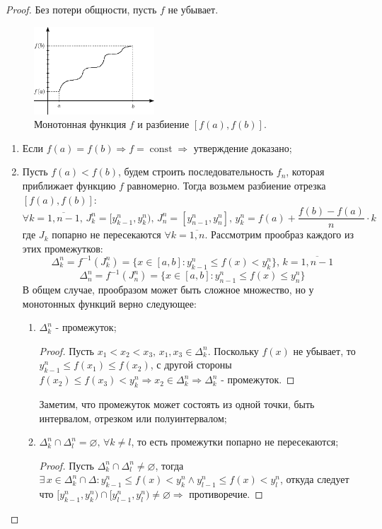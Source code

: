 \documentclass[12pt]{article}
\newcommand{\VN}{\varnothing}
\theoremstyle{definition}
\DeclareMathOperator{\const}{\text{const}}
\begin{document}
\begin{proof}
	Без потери общности, пусть $f$ не убывает.
	\begin{figure}[H]
		\centering
		\includegraphics[width=0.4\textwidth]{22_2.eps}
		\caption{Монотонная функция $f$ и разбиение $[f(a),f(b)]$.}
		\label{22_2}
	\end{figure}
	\begin{enumerate}[label={\arabic*)}]
		\item Если $f(a) = f(b) \Rightarrow f = \const \Rightarrow$ утверждение доказано;
		\item Пусть $f(a) < f(b)$, будем строить последовательность $f_n$, которая приближает функцию $f$ равномерно. Тогда возьмем разбиение отрезка $[f(a),f(b)]$: 
		$$
			\forall k = \overline{1,n-1}, \, J_k^n = [y_{k-1}^n,y_k^n), \, J_n^n = [y_{n-1}^n, y_n^n], \,  y_k^n = f(a) + \dfrac{f(b) - f(a)}{n}{\cdot}k
		$$
		где $J_k$ попарно не пересекаются $\forall k = \overline{1,n}$. Рассмотрим прообраз каждого из этих промежутков:
		$$
			\Delta_k^n = f^{-1}(J_k^n) = \{x \in [a,b] \colon y_{k-1}^n \leq f(x) < y_k^n\}, \, k = \overline{1,n-1}
		$$
		$$
			\Delta_n^n = f^{-1}(J_n^n) = \{x \in [a,b] \colon y_{n-1}^n \leq f(x) \leq y_n^n\}
		$$
		В общем случае, прообразом может быть сложное множество, но у монотонных функций верно следующее:
		\begin{enumerate}[label={(\arabic*)}]
			\item $\Delta_k^n$ - промежуток;
			\begin{proof}
				Пусть $x_1 < x_2 < x_3, \, x_1, x_3 \in \Delta_k^n$. Поскольку $f(x)$ не убывает, то $y_{k-1}^n \leq f(x_1) \leq f(x_2)$, с другой стороны $f(x_2) \leq f(x_3) < y_k^n \Rightarrow x_2 \in \Delta_k^n \Rightarrow \Delta_k^n$ - промежуток.
			\end{proof}
			Заметим, что промежуток может состоять из одной точки, быть интервалом, отрезком или полуинтервалом;
			\item $\Delta_k^n \cap \Delta_l^n = \VN, \, \forall k \neq l$, то есть промежутки попарно не пересекаются;
			\begin{proof}
				Пусть $\Delta_k^n \cap \Delta_l^n \neq \VN$, тогда $\exists \, x \in \Delta_k^n \cap \Delta\colon y_{k-1}^n \leq f(x) < y_k^n \wedge y_{l-1}^n \leq f(x) < y_l^n$, откуда следует что $[y_{k-1}^n, y_k^n) \cap [y_{l-1}^n, y_l^n) \neq \VN \Rightarrow$ противоречие.

\end{proof}
\end{enumerate}
\end{enumerate}
\end{proof}
\end{document}
